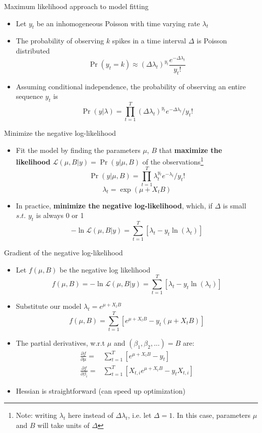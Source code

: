 \documentclass[svgnames,13pt,handout]{beamer}
\DeclareRobustCommand{\emph}[1]{\textbf{{\color{emphasizecolor} #1}}}
\begin{document}
\begin{frame}{Maximum likelihood approach to model fitting}
\begin{itemize}
	\item <1->Let $y_t$ be an inhomogeneous Poisson with time varying rate $\lambda_t$
	\item <2->The probability of observing $k$ spikes in a time interval $\Delta$ is Poisson distributed\[\Pr(y_t=k) \approx (\Delta \lambda_t)^{y_t} \frac{ e^{-\Delta \lambda_t}}{y_t!}\]
	\item <3->Assuming conditional independence, the probability of observing an entire sequence $y_t$ is \[\Pr(y|\lambda) = \prod_{t=1}^T (\Delta\lambda_t)^{y_t} e^{-\Delta\lambda_t} / {y_t}! \]
\end{itemize}
\end{frame} 

\begin{frame}{Minimize the negative log-likelihood}
\begin{itemize}
	\item <1->Fit the model by finding the parameters $\mu$, $B$ that \emph{maximize the likelihood} $\mathcal{L}(\mu,B|y) = \Pr(y|\mu,B)$ of the observations\footnote{Note: writing $\lambda_t$ here instead of $\Delta\lambda_t$, i.e. let $\Delta=1$. In this case, parameters $\mu$ and $B$ will take units of $\Delta$} \[\Pr(y|\mu,B) = \prod_{t=1}^T \lambda_t^{y_t} e^{-\lambda_t} / {y_t}! \]\[\lambda_t=\exp(\mu + X_t B)\]
	\item <2->In practice, \emph{minimize the negative log-likelihood}, which, if $\Delta$ is small $s.t.$ $y_t$ is always 0 or 1 \[ -\ln\mathcal{L}(\mu,B|y) =  \sum_{t=1}^T[ \lambda_t - y_t \ln(\lambda_t) ]\]
\end{itemize}
\end{frame} 

\begin{frame}{Gradient of the negative log-likelihood}
\begin{itemize}
	\item <1->Let $f(\mu,B)$ be the negative log likelihood \[f(\mu,B) = -\ln\mathcal{L}(\mu,B|y) =  \sum_{t=1}^T[ \lambda_t - y_t \ln(\lambda_t) ]\]
	\item <2->Substitute our model $\lambda_t=e^{\mu + X_t B}$ \[f(\mu,B) =  \sum_{t=1}^T[ e^{\mu + X_t B} - y_t (\mu + X_t B) ]\]
	\item <3->The partial derivatives, w.r.t $\mu$ and $(\beta_1,\beta_2,...)=B$ are:\[\begin{aligned}\frac{\partial f}{\partial	\mu}=&\sum_{t=1}^T[e^{\mu+X_t B}-y_t]\\\frac{\partial f}{\partial\beta_i}=&\sum_{t=1}^T[X_{t,i} e^{\mu+X_t B}-y_t X_{t,i}]\end{aligned}\]
	\item <4->Hessian is straightforward (can speed up optimization)
\end{itemize}
\end{frame} 
\end{document}

